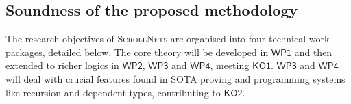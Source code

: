 \documentclass[11pt]{msca-pf}
\newcommand{\proj}{\small\textsc{ScrollNets}}
\newcommand{\KO}[1]{$\mathsf{KO#1}$}
\newcommand{\WP}[1]{$\mathsf{WP#1}$}
\begin{document}



\subsection{Soundness of the proposed methodology}
\label{ssc:excellence:methodology}


The research objectives of {\proj} are organised into four technical work packages, detailed below.
The core theory will be developed in \WP{1} and then extended to richer logics in \WP{2}, \WP{3} and
\WP{4}, meeting \KO{1}. \WP{3} and \WP{4} will deal with crucial features found in SOTA proving and
programming systems like recursion and dependent types, contributing to \KO{2}.
\end{document}
